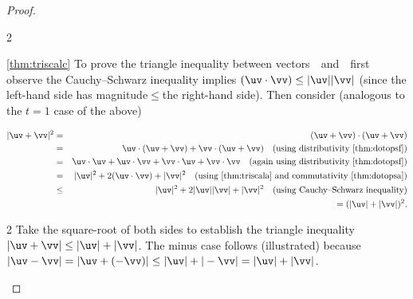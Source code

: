 \begin{proof}
\begin{description}
\begin{figbox}{2}
\item[\ref{thm:triscalc}]
To prove the triangle inequality between vectors~\uv\ and~\vv\ first observe the Cauchy--Schwarz inequality implies \((\uv\cdot\vv)\leq|\uv||\vv|\) (since the left-hand side has magnitude\({}\leq{}\)the right-hand side).
Then consider (analogous to the \(t=1\) case of the above)
\end{figbox}
\begin{eqnarray*}
|\uv+\vv|^2
&=&(\uv+\vv)\cdot(\uv+\vv)
\\&=&\uv\cdot(\uv+\vv)+\vv\cdot(\uv+\vv)
\quad(\text{using distributivity~\ref{thm:dotopsf}})
\\&=&\uv\cdot\uv+\uv\cdot\vv+\vv\cdot\uv+\vv\cdot\vv
\quad(\text{again using distributivity~\ref{thm:dotopsf}})
\\&=&|\uv|^2+2(\uv\cdot\vv)+|\vv|^2
\quad(\text{using~\ref{thm:triscala} and commutativity~\ref{thm:dotopsa}})
\\&\leq&|\uv|^2+2|\uv||\vv|+|\vv|^2
\quad(\text{using Cauchy--Schwarz inequality})
\\&&{}=(|\uv|+|\vv|)^2.
\end{eqnarray*}
\begin{figbox}{2}%
Take the square-root of both sides to establish the triangle inequality \(|\uv+\vv|\leq|\uv|+|\vv|\).
The minus case follows (illustrated) because \(|\uv-\vv|=|\uv+(-\vv)|\leq|\uv|+|-\vv|=|\uv|+|\vv|\).   

\end{figbox}
\end{description}
\end{proof}

\reParshape


